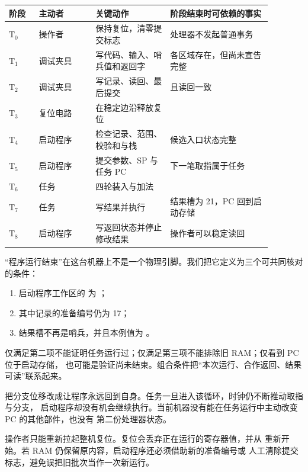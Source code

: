 \begin{longtable}{|L{0.10\linewidth}|L{0.19\linewidth}|L{0.25\linewidth}|L{0.34\linewidth}|}
\hline
{}
阶段 & 主动者 & 关键动作 & 阶段结束时可依赖的事实 \\ \hline
\(\mathrm{T_0}\) & 操作者 & 保持复位，清零提交标志 & 处理器不发起普通事务 \\ \hline
\(\mathrm{T_1}\) & 调试夹具 & 写代码、输入、哨兵值和返回字 & 各区域存在，但尚未宣告完整 \\ \hline
\(\mathrm{T_2}\) & 调试夹具 & 写记录、读回、最后提交 &  且读回一致 \\ \hline
\(\mathrm{T_3}\) & 复位电路 & 在稳定边沿释放复位 &  \\ \hline
\(\mathrm{T_4}\) & 启动程序 & 检查记录、范围、校验和与栈 & 候选入口状态完整 \\ \hline
\(\mathrm{T_5}\) & 启动程序 & 提交参数、SP 与任务 PC & 下一笔取指属于任务 \\ \hline
\(\mathrm{T_6}\) & 任务 & 四轮装入与加法 &  \\ \hline
\(\mathrm{T_7}\) & 任务 & 写结果并执行  & 结果槽为 21，PC 回到启动存储 \\ \hline
\(\mathrm{T_8}\) & 启动程序 & 写返回状态并停止修改结果 & 操作者可以稳定读回 \\ \hline
\end{longtable}

“程序运行结束”在这台机器上不是一个物理引脚。我们把它定义为三个可共同核对的条件：

\begin{enumerate}
\item 启动程序工作区的  为 ；
\item 其中记录的准备编号仍为 17；
\item 结果槽不再是哨兵，并且本例值为 。
\end{enumerate}

仅满足第二项不能证明任务运行过；仅满足第三项不能排除旧 RAM；仅看到 PC 位于启动存储，
也可能是验证尚未结束。组合条件把“本次运行、合作返回、结果可读”联系起来。


把分支位移改成让程序永远回到自身。任务一旦进入该循环，时钟仍不断推动取指与分支，
启动程序却没有机会继续执行。当前机器没有能在任务运行中主动改变 PC 的其他部件，也没有
第二份处理器状态。

操作者只能重新拉起整机复位。复位会丢弃正在运行的寄存器值，并从
 重新开始。若 RAM 仍保留原内容，启动程序还必须借助新的准备编号或
人工清除提交标志，避免误把旧批次当作一次新运行。



